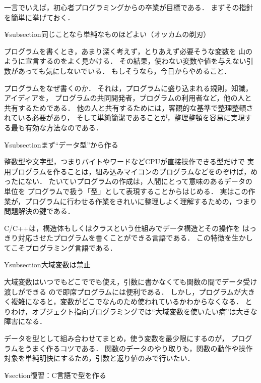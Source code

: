 一言でいえば，初心者プログラミングからの卒業が目標である．
まずその指針を簡単に挙げておく．

¥subsection{同じことなら単純なものほどよい（オッカムの剃刃）}

プログラムを書くとき，あまり深く考えず，とりあえず必要そうな変数を
山のように宣言するのをよく見かける．
その結果，使わない変数や値を与えない引数があっても気にしないでいる．
もしそうなら，今日からやめること．

プログラムをなぜ書くのか．
それは，プログラムに盛り込まれる規則，知識，アイディアを，
プログラムの共同開発者，プログラムの利用者など，他の人と共有するためである．
他の人と共有するためには，客観的な基準で整理整頓されている必要があり，
そして単純簡潔であることが，整理整頓を容易に実現する最も有効な方法なのである．

¥subsection{まず``データ型''から作る}

整数型や文字型，つまりバイトやワードなどCPUが直接操作できる型だけで
実用プログラムを作ることは，組み込みマイコンのプログラムなどをのぞけば，めったにない．
たいていプログラムの作成は，人間にとって意味のあるデータの単位を
プログラムで扱う「型」として表現することからはじめる．
実はこの作業が，プログラムに行わせる作業をきれいに整理しよく理解するための，つまり問題解決の鍵である．

C/C++は，構造体もしくはクラスという仕組みでデータ構造とその操作を
はっきり対応させたプログラムを書くことができる言語である．
この特徴を生かしてこそプログラミング言語である．



¥subsection{大域変数は禁止}

大域変数はいつでもどこででも使え，引数に書かなくても関数の間でデータ受け渡しができる
ので即席プログラムには便利である．
しかし，プログラムが大きく複雑になると，変数がどこでなんのため使われているかわからなくなる．
とりわけ，オブジェクト指向プログラミングでは``大域変数を使いたい病''は大きな障害になる．

データを型として組み合わせてまとめ，使う変数を最少限にするのが，
プログラムをうまく作るコツである．
関数のデータのやり取りも，関数の動作や操作対象を単純明快にするため，引数と返り値のみで行いたい．


¥section{復習：C言語で型を作る}

